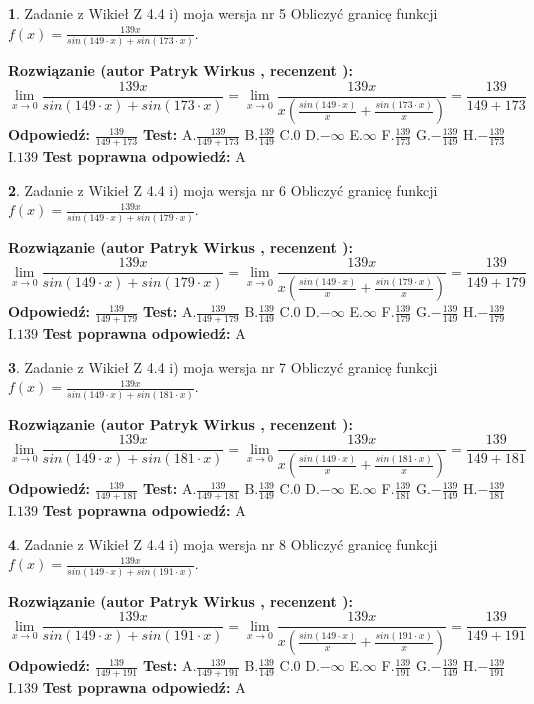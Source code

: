 \documentclass[12pt, a4paper]{article}
\theoremstyle{definition} %
\newtheorem{zad}{}
\newcommand{\zadStart}[1]{\begin{zad}#1\newline}
\newcommand{\zadStop}{\end{zad}}
\newcommand{\rozwStart}[2]{\noindent \textbf{Rozwiązanie (autor #1 , recenzent #2): }\newline}
\newcommand{\rozwStop}{\newline}
\newcommand{\odpStart}{\noindent \textbf{Odpowiedź:}\newline}
\newcommand{\odpStop}{\newline}
\newcommand{\testStart}{\noindent \textbf{Test:}\newline}
\newcommand{\testStop}{\newline}
\newcommand{\kluczStart}{\noindent \textbf{Test poprawna odpowiedź:}\newline}
\newcommand{\kluczStop}{\newline}
\begin{document}
\zadStart{Zadanie z Wikieł Z 4.4 i) moja wersja nr 5}
Obliczyć granicę funkcji $f(x)=\frac{139x}{sin(149\cdot x) +sin(173\cdot x)}$.
\zadStop
\rozwStart{Patryk Wirkus}{}
$$\lim\limits_{x\to 0}\frac{139x}{sin(149\cdot x) +sin(173\cdot x)}=\lim\limits_{x\to 0}\frac{139x}{x(\frac{sin(149\cdot x)}{x}+\frac{sin(173\cdot x)}{x})}=\frac{139}{149+173}$$
\rozwStop
\odpStart
$\frac{139}{149+173}$
\odpStop
\testStart
A.$\frac{139}{149+173}$
B.$\frac{139}{149}$
C.$0$
D.$-\infty$
E.$\infty$
F.$\frac{139}{173}$
G.$-\frac{139}{149}$
H.$-\frac{139}{173}$
I.$139$
\testStop
\kluczStart
A
\kluczStop



\zadStart{Zadanie z Wikieł Z 4.4 i) moja wersja nr 6}
Obliczyć granicę funkcji $f(x)=\frac{139x}{sin(149\cdot x) +sin(179\cdot x)}$.
\zadStop
\rozwStart{Patryk Wirkus}{}
$$\lim\limits_{x\to 0}\frac{139x}{sin(149\cdot x) +sin(179\cdot x)}=\lim\limits_{x\to 0}\frac{139x}{x(\frac{sin(149\cdot x)}{x}+\frac{sin(179\cdot x)}{x})}=\frac{139}{149+179}$$
\rozwStop
\odpStart
$\frac{139}{149+179}$
\odpStop
\testStart
A.$\frac{139}{149+179}$
B.$\frac{139}{149}$
C.$0$
D.$-\infty$
E.$\infty$
F.$\frac{139}{179}$
G.$-\frac{139}{149}$
H.$-\frac{139}{179}$
I.$139$
\testStop
\kluczStart
A
\kluczStop



\zadStart{Zadanie z Wikieł Z 4.4 i) moja wersja nr 7}
Obliczyć granicę funkcji $f(x)=\frac{139x}{sin(149\cdot x) +sin(181\cdot x)}$.
\zadStop
\rozwStart{Patryk Wirkus}{}
$$\lim\limits_{x\to 0}\frac{139x}{sin(149\cdot x) +sin(181\cdot x)}=\lim\limits_{x\to 0}\frac{139x}{x(\frac{sin(149\cdot x)}{x}+\frac{sin(181\cdot x)}{x})}=\frac{139}{149+181}$$
\rozwStop
\odpStart
$\frac{139}{149+181}$
\odpStop
\testStart
A.$\frac{139}{149+181}$
B.$\frac{139}{149}$
C.$0$
D.$-\infty$
E.$\infty$
F.$\frac{139}{181}$
G.$-\frac{139}{149}$
H.$-\frac{139}{181}$
I.$139$
\testStop
\kluczStart
A
\kluczStop



\zadStart{Zadanie z Wikieł Z 4.4 i) moja wersja nr 8}
Obliczyć granicę funkcji $f(x)=\frac{139x}{sin(149\cdot x) +sin(191\cdot x)}$.
\zadStop
\rozwStart{Patryk Wirkus}{}
$$\lim\limits_{x\to 0}\frac{139x}{sin(149\cdot x) +sin(191\cdot x)}=\lim\limits_{x\to 0}\frac{139x}{x(\frac{sin(149\cdot x)}{x}+\frac{sin(191\cdot x)}{x})}=\frac{139}{149+191}$$
\rozwStop
\odpStart
$\frac{139}{149+191}$
\odpStop
\testStart
A.$\frac{139}{149+191}$
B.$\frac{139}{149}$
C.$0$
D.$-\infty$
E.$\infty$
F.$\frac{139}{191}$
G.$-\frac{139}{149}$
H.$-\frac{139}{191}$
I.$139$
\testStop
\kluczStart
A
\kluczStop
\end{document}
